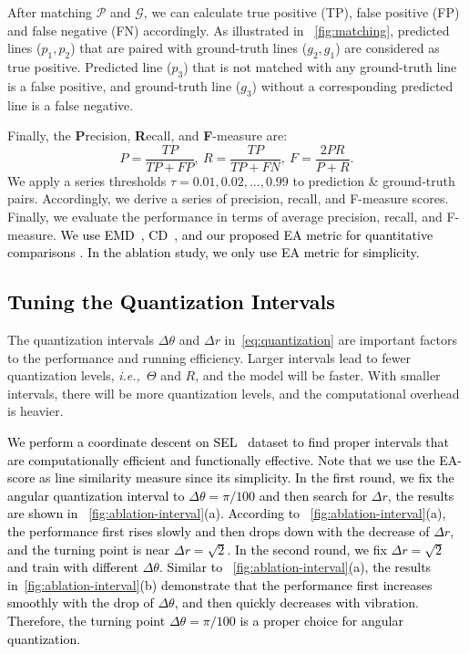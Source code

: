 \documentclass[10pt,journal,cspaper,compsoc]{IEEEtran}
\newcommand{\revise}[1]{{\textcolor{black}{#1}}}
\newcommand{\rerevise}[1]{{\textcolor{black}{#1}}}
\def\ie{\emph{i.e.,~}}
\begin{document}
After matching $\mathcal{P}$ and $\mathcal{G}$, we can calculate true positive
(TP), false positive (FP) and false negative (FN) accordingly.
As illustrated in ~\cref{fig:matching}, predicted lines ($p_1, p_2$) that are paired with
ground-truth lines ($g_2, g_1$) are considered as true positive.
Predicted line ($p_3$) that is not matched with any ground-truth line is
a false positive,
and ground-truth line ($g_3$) without a corresponding predicted line
is a false negative.

Finally, the \textbf{P}recision, \textbf{R}ecall, and \textbf{F}-measure are:
\begin{equation}
    P = \frac{TP}{TP+FP}, \
    R = \frac{TP}{TP+FN}, \
    F = \frac{2PR}{P + R}.
    \label{eq:pr}
\end{equation}
We apply a series thresholds $\tau = 0.01, 0.02,...,0.99$ to prediction \& ground-truth pairs.
Accordingly, we derive a series of precision, recall, and F-measure scores.
Finally, we evaluate the performance in terms of average precision, recall, and
F-measure. \rerevise{We use EMD~\cite{rubner2000earth}, CD~\cite{borgefors1986distance}, and our proposed EA metric
for quantitative comparisons .
In the ablation study, we only use EA metric for simplicity.}

\subsection{\revise{Tuning the Quantization Intervals}}\label{sec:quant-intervals}
The quantization intervals $\Delta\theta$ and $\Delta r$ in~\cref{eq:quantization}
are important factors to the performance and running efficiency.
Larger intervals lead to fewer quantization levels, \ie $\Theta$ and $R$,
and the model will be faster.
With smaller intervals, there will be more quantization levels,
and the computational overhead is heavier.

\revise{We perform a coordinate descent on SEL~\cite{lee2017semantic} dataset
to find proper intervals that are computationally efficient and functionally
effective.
Note that we use the EA-score as line similarity measure since its simplicity.
In the first round, we fix the angular quantization interval to $\Delta\theta=\pi/100$
and then search for $\Delta r$,
the results are shown in ~\cref{fig:ablation-interval}(a).
According to ~\cref{fig:ablation-interval}(a),
the performance first rises slowly and then drops down with the decrease of $\Delta r$,
and the turning point is near $\Delta r = \sqrt{2}$.
In the second round, we fix $\Delta r = \sqrt{2}$ and train with different $\Delta\theta$.
Similar to ~\cref{fig:ablation-interval}(a),
the results in~\cref{fig:ablation-interval}(b) demonstrate that
the performance first increases smoothly with the drop of $\Delta \theta$,
and then quickly decreases with vibration.
Therefore, the turning point $\Delta\theta=\pi/100$ is a proper choice for angular quantization.}
\end{document}
